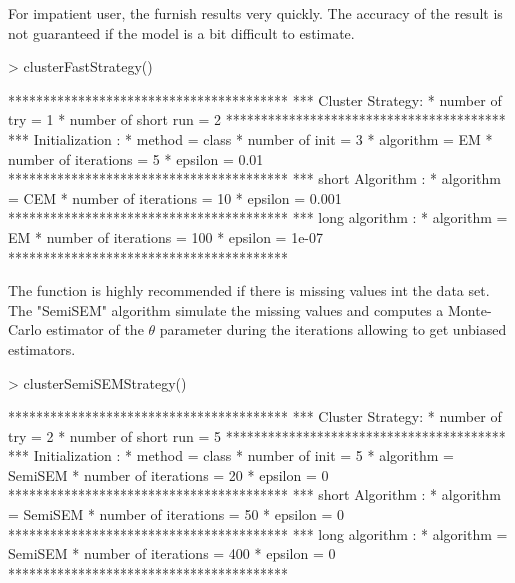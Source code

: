 \documentclass[shortnames,nojss,article]{jss}
\begin{document}
For impatient user, the  furnish results very quickly.
The accuracy of the result is not guaranteed if the model is a bit difficult to
estimate.
\begin{Schunk}
\begin{Sinput}
> clusterFastStrategy()
\end{Sinput}
\begin{Soutput}
****************************************
*** Cluster Strategy:
* number of try         =  1 
* number of short run   =  2 
****************************************
*** Initialization :
* method =  class 
* number of init       =  3 
* algorithm            =  EM 
* number of iterations =  5 
* epsilon              =  0.01 
****************************************
*** short Algorithm :
* algorithm            =  CEM 
* number of iterations =  10 
* epsilon              =  0.001 
****************************************
*** long algorithm :
* algorithm            =  EM 
* number of iterations =  100 
* epsilon              =  1e-07 
****************************************
\end{Soutput}
\end{Schunk}

The function  is highly recommended if there is
missing values int the data set. The "SemiSEM" algorithm simulate the missing
values and computes a Monte-Carlo estimator of the $\theta$ parameter during the
iterations allowing to get unbiased estimators.
\begin{Schunk}
\begin{Sinput}
> clusterSemiSEMStrategy()
\end{Sinput}
\begin{Soutput}
****************************************
*** Cluster Strategy:
* number of try         =  2 
* number of short run   =  5 
****************************************
*** Initialization :
* method =  class 
* number of init       =  5 
* algorithm            =  SemiSEM 
* number of iterations =  20 
* epsilon              =  0 
****************************************
*** short Algorithm :
* algorithm            =  SemiSEM 
* number of iterations =  50 
* epsilon              =  0 
****************************************
*** long algorithm :
* algorithm            =  SemiSEM 
* number of iterations =  400 
* epsilon              =  0 
****************************************
\end{Soutput}
\end{Schunk}
\end{document}
